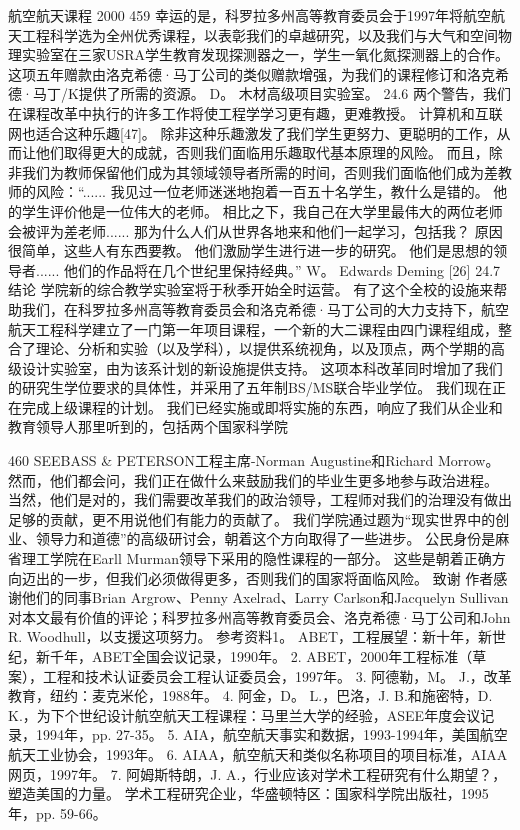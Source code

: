 \documentclass[UTF8,11pt,a4paper,openany,fontset=fandol]{ctexbook}
\begin{document}
航空航天课程 2000 459 幸运的是，科罗拉多州高等教育委员会于1997年将航空航天工程科学选为全州优秀课程，以表彰我们的卓越研究，以及我们与大气和空间物理实验室在三家USRA学生教育发现探测器之一，学生一氧化氮探测器上的合作。 这项五年赠款由洛克希德·马丁公司的类似赠款增强，为我们的课程修订和洛克希德·马丁/K提供了所需的资源。 D。 木材高级项目实验室。 24.6 两个警告，我们在课程改革中执行的许多工作将使工程学学习更有趣，更难教授。 计算机和互联网也适合这种乐趣[47]。 除非这种乐趣激发了我们学生更努力、更聪明的工作，从而让他们取得更大的成就，否则我们面临用乐趣取代基本原理的风险。 而且，除非我们为教师保留他们成为其领域领导者所需的时间，否则我们面临他们成为差教师的风险：“...... 我见过一位老师迷迷地抱着一百五十名学生，教什么是错的。 他的学生评价他是一位伟大的老师。 相比之下，我自己在大学里最伟大的两位老师会被评为差老师...... 那为什么人们从世界各地来和他们一起学习，包括我？ 原因很简单，这些人有东西要教。 他们激励学生进行进一步的研究。 他们是思想的领导者...... 他们的作品将在几个世纪里保持经典。” W。 Edwards Deming [26] 24.7 结论 学院新的综合教学实验室将于秋季开始全时运营。 有了这个全校的设施来帮助我们，在科罗拉多州高等教育委员会和洛克希德·马丁公司的大力支持下，航空航天工程科学建立了一门第一年项目课程，一个新的大二课程由四门课程组成，整合了理论、分析和实验（以及学科），以提供系统视角，以及顶点，两个学期的高级设计实验室，由为该系计划的新设施提供支持。 这项本科改革同时增加了我们的研究生学位要求的具体性，并采用了五年制BS/MS联合毕业学位。 我们现在正在完成上级课程的计划。 我们已经实施或即将实施的东西，响应了我们从企业和教育领导人那里听到的，包括两个国家科学院

460 SEEBASS \& PETERSON工程主席-Norman Augustine和Richard Morrow。 然而，他们都会问，我们正在做什么来鼓励我们的毕业生更多地参与政治进程。 当然，他们是对的，我们需要改革我们的政治领导，工程师对我们的治理没有做出足够的贡献，更不用说他们有能力的贡献了。 我们学院通过题为“现实世界中的创业、领导力和道德”的高级研讨会，朝着这个方向取得了一些进步。 公民身份是麻省理工学院在Earll Murman领导下采用的隐性课程的一部分。 这些是朝着正确方向迈出的一步，但我们必须做得更多，否则我们的国家将面临风险。 致谢 作者感谢他们的同事Brian Argrow、Penny Axelrad、Larry Carlson和Jacquelyn Sullivan对本文最有价值的评论；科罗拉多州高等教育委员会、洛克希德·马丁公司和John R. Woodhull，以支援这项努力。 参考资料1。 ABET，工程展望：新十年，新世纪，新千年，ABET全国会议记录，1990年。 2. ABET，2000年工程标准（草案），工程和技术认证委员会工程认证委员会，1997年。 3. 阿德勒，M。 J.，改革教育，纽约：麦克米伦，1988年。 4. 阿金，D。 L.，巴洛，J. B.和施密特，D. K.，为下个世纪设计航空航天工程课程：马里兰大学的经验，ASEE年度会议记录，1994年，pp. 27-35。 5. AIA，航空航天事实和数据，1993-1994年，美国航空航天工业协会，1993年。 6. AIAA，航空航天和类似名称项目的项目标准，AIAA网页，1997年。 7. 阿姆斯特朗，J. A.，行业应该对学术工程研究有什么期望？，塑造美国的力量。 学术工程研究企业，华盛顿特区：国家科学院出版社，1995年，pp. 59-66。
\end{document}
